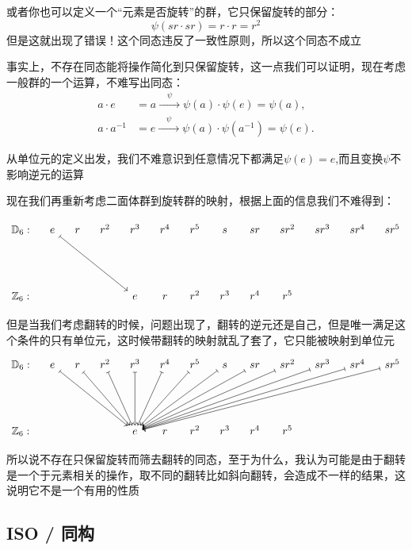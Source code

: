 \documentclass[UTF8]{ctexbook}
\begin{document}
或者你也可以定义一个“元素是否旋转”的群，它只保留旋转的部分：
\[
\psi(sr \cdot sr ) =r \cdot r = r^2
\]
但是这就出现了错误！这个同态违反了一致性原则，所以这个同态不成立

事实上，不存在同态能将操作简化到只保留旋转，这一点我们可以证明，现在考虑一般群的一个运算，不难写出同态：
\[
\begin{aligned}
a \cdot e &= a \xrightarrow{\quad \psi \quad } \psi(a) \cdot \psi(e)=\psi(a),\\
a \cdot a^{-1} &= e \xrightarrow{\quad \psi \quad } \psi(a) \cdot \psi(a^{-1})=\psi(e).
\end{aligned}
\]

从单位元的定义出发，我们不难意识到任意情况下都满足$\psi(e)=e$,而且变换$\psi$不影响逆元的运算

现在我们再重新考虑二面体群到旋转群的映射，根据上面的信息我们不难得到：

\[
\begin{tikzcd}[column sep=1em, row sep=4.5em]
\mathbb{D}_6:
& e \arrow[drrr, mapsto]
& r 
& r^2 
& r^3 
& r^4 
& r^5
& s 
& sr 
& sr^2 
& sr^3 
& sr^4 
& sr^5 
\\
\mathbb{Z}_6:
&
&
&
& e 
& r 
& r^2 
& r^3 
& r^4 
& r^5 
\end{tikzcd}
\]

但是当我们考虑翻转的时候，问题出现了，翻转的逆元还是自己，但是唯一满足这个条件的只有单位元，这时候带翻转的映射就乱了套了，它只能被映射到单位元
\[
\begin{tikzcd}[column sep=1em, row sep=4.5em]
\mathbb{D}_6:
& e \arrow[drrr, mapsto]
& r \arrow[drr, mapsto]
& r^2 \arrow[dr, mapsto]
& r^3 \arrow[d,mapsto]
& r^4 \arrow[dl, mapsto]
& r^5 \arrow[dll, mapsto]
& s \arrow[dlll, mapsto]
& sr \arrow[dllll, mapsto]
& sr^2 \arrow[dlllll, mapsto]
& sr^3 \arrow[dllllll, mapsto]
& sr^4 \arrow[dlllllll, mapsto]
& sr^5 \arrow[dllllllll, mapsto]
\\
\mathbb{Z}_6:
&
&
&
& e 
& r 
& r^2 
& r^3 
& r^4 
& r^5 
\end{tikzcd}
\]

所以说不存在只保留旋转而筛去翻转的同态，至于为什么，我认为可能是由于翻转是一个于元素相关的操作，取不同的翻转比如斜向翻转，会造成不一样的结果，这说明它不是一个有用的性质


\subsection{ISO / 同构}
\end{document}
